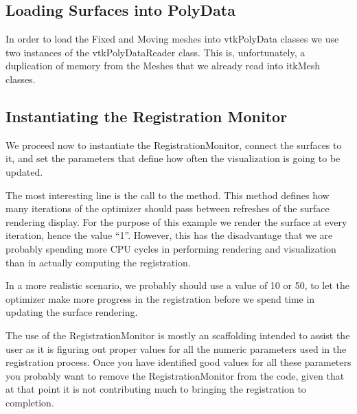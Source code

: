 \documentclass{InsightArticle}
\begin{document}
\subsection{Loading Surfaces into PolyData}

In order to load the Fixed and Moving meshes into vtkPolyData classes we use
two instances of the vtkPolyDataReader class. This is, unfortunately, a
duplication of memory from the Meshes that we already read into itkMesh classes.

\begin{center}

\end{center}


\subsection{Instantiating the Registration Monitor}

We proceed now to instantiate the RegistrationMonitor, connect the surfaces to
it, and set the parameters that define how often the visualization is going to
be updated.

\begin{center}

\end{center}

The most interesting line is the call to the
 method. This method defines how many
iterations of the optimizer should pass between refreshes of the surface
rendering display. For the purpose of this example we render the surface at
every iteration, hence the value ``1''. However, this has the disadvantage that
we are probably spending more CPU cycles in performing rendering and
visualization than in actually computing the registration.

In a more realistic scenario, we probably should use a value of 10 or 50, to
let the optimizer make more progress in the registration before we spend time
in updating the surface rendering.

The use of the RegistrationMonitor is mostly an scaffolding intended to assist
the user as it is figuring out proper values for all the numeric parameters
used in the registration process. Once you have identified good values for all
these parameters you probably want to remove the RegistrationMonitor from the
code, given that at that point it is not contributing much to bringing the
registration to completion.


%
%



\end{document}
